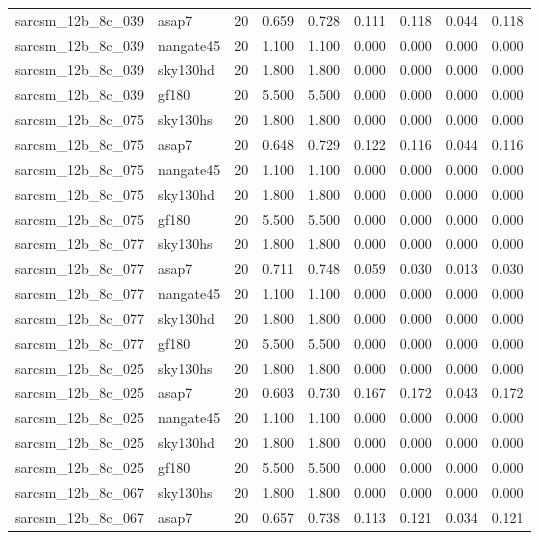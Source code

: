 \begin{tabular}{llrrrrrrr}
sarcsm\_12b\_8c\_039 & asap7 & 20 & 0.659 & 0.728 & 0.111 & 0.118 & 0.044 & 0.118 \\
sarcsm\_12b\_8c\_039 & nangate45 & 20 & 1.100 & 1.100 & 0.000 & 0.000 & 0.000 & 0.000 \\
sarcsm\_12b\_8c\_039 & sky130hd & 20 & 1.800 & 1.800 & 0.000 & 0.000 & 0.000 & 0.000 \\
sarcsm\_12b\_8c\_039 & gf180 & 20 & 5.500 & 5.500 & 0.000 & 0.000 & 0.000 & 0.000 \\
sarcsm\_12b\_8c\_075 & sky130hs & 20 & 1.800 & 1.800 & 0.000 & 0.000 & 0.000 & 0.000 \\
sarcsm\_12b\_8c\_075 & asap7 & 20 & 0.648 & 0.729 & 0.122 & 0.116 & 0.044 & 0.116 \\
sarcsm\_12b\_8c\_075 & nangate45 & 20 & 1.100 & 1.100 & 0.000 & 0.000 & 0.000 & 0.000 \\
sarcsm\_12b\_8c\_075 & sky130hd & 20 & 1.800 & 1.800 & 0.000 & 0.000 & 0.000 & 0.000 \\
sarcsm\_12b\_8c\_075 & gf180 & 20 & 5.500 & 5.500 & 0.000 & 0.000 & 0.000 & 0.000 \\
sarcsm\_12b\_8c\_077 & sky130hs & 20 & 1.800 & 1.800 & 0.000 & 0.000 & 0.000 & 0.000 \\
sarcsm\_12b\_8c\_077 & asap7 & 20 & 0.711 & 0.748 & 0.059 & 0.030 & 0.013 & 0.030 \\
sarcsm\_12b\_8c\_077 & nangate45 & 20 & 1.100 & 1.100 & 0.000 & 0.000 & 0.000 & 0.000 \\
sarcsm\_12b\_8c\_077 & sky130hd & 20 & 1.800 & 1.800 & 0.000 & 0.000 & 0.000 & 0.000 \\
sarcsm\_12b\_8c\_077 & gf180 & 20 & 5.500 & 5.500 & 0.000 & 0.000 & 0.000 & 0.000 \\
sarcsm\_12b\_8c\_025 & sky130hs & 20 & 1.800 & 1.800 & 0.000 & 0.000 & 0.000 & 0.000 \\
sarcsm\_12b\_8c\_025 & asap7 & 20 & 0.603 & 0.730 & 0.167 & 0.172 & 0.043 & 0.172 \\
sarcsm\_12b\_8c\_025 & nangate45 & 20 & 1.100 & 1.100 & 0.000 & 0.000 & 0.000 & 0.000 \\
sarcsm\_12b\_8c\_025 & sky130hd & 20 & 1.800 & 1.800 & 0.000 & 0.000 & 0.000 & 0.000 \\
sarcsm\_12b\_8c\_025 & gf180 & 20 & 5.500 & 5.500 & 0.000 & 0.000 & 0.000 & 0.000 \\
sarcsm\_12b\_8c\_067 & sky130hs & 20 & 1.800 & 1.800 & 0.000 & 0.000 & 0.000 & 0.000 \\
sarcsm\_12b\_8c\_067 & asap7 & 20 & 0.657 & 0.738 & 0.113 & 0.121 & 0.034 & 0.121 \\

\end{tabular}
